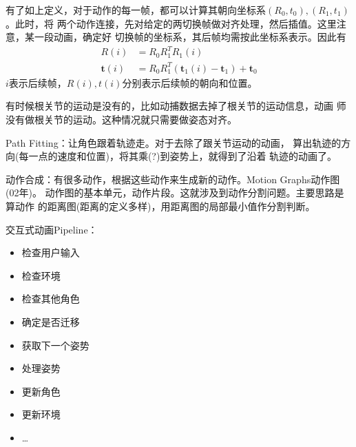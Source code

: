 \documentclass[lang=cn,newtx,10pt,scheme=chinese]{elegantbook}
\begin{document}
有了如上定义，对于动作的每一帧，都可以计算其朝向坐标系$(R_0, t_0), (R_1, t_1)$。此时，将
两个动作连接，先对给定的两切换帧做对齐处理，然后插值。这里注意，某一段动画，确定好
切换帧的坐标系，其后帧均需按此坐标系表示。因此有
\begin{equation}
  \begin{aligned}
  R(i)&=R_0 R^{T}_1 R_1(i)\\
  \boldsymbol{t}(i)&=R_0 R_1 ^T (\boldsymbol{t}_1(i)-\boldsymbol{t}_1) + \boldsymbol{t}_0
  \end{aligned}
\end{equation}
$i$表示后续帧，$R(i),t(i)$分别表示后续帧的朝向和位置。

有时候根关节的运动是没有的，比如动捕数据去掉了根关节的运动信息，动画
师没有做根关节的运动。这种情况就只需要做姿态对齐。

Path Fitting：让角色跟着轨迹走。对于去除了跟关节运动的动画，
算出轨迹的方向(每一点的速度和位置)，将其乘(?)到姿势上，就得到了沿着
轨迹的动画了。

动作合成：有很多动作，根据这些动作来生成新的动作。Motion Graphs动作图(02年)。
动作图的基本单元，动作片段。这就涉及到动作分割问题。主要思路是算动作
的距离图(距离的定义多样)，用距离图的局部最小值作分割判断。


交互式动画Pipeline：
\begin{itemize}
  \setlength{\itemindent}{2em}
  \item 检查用户输入
  \item 检查环境
  \item 检查其他角色
  \item 确定是否迁移
  \item 获取下一个姿势
  \item 处理姿势
  \item 更新角色
  \item 更新环境
  \item \dots
\end{itemize}
\end{document}
